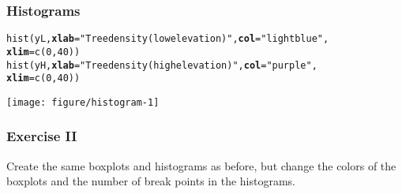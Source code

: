 \documentclass[color=usenames,dvipsnames]{beamer}\usepackage[]{graphicx}\usepackage[]{color}
\makeatletter
\newcommand{\hlnum}[1]{\textcolor[rgb]{0.69,0.494,0}{#1}}%
\newcommand{\hlstr}[1]{\textcolor[rgb]{0.749,0.012,0.012}{#1}}%
\newcommand{\hlstd}[1]{\textcolor[rgb]{0,0,0}{#1}}%
\newcommand{\hlkwc}[1]{\textcolor[rgb]{0,0,0}{\textbf{#1}}}%
\newcommand{\hlkwd}[1]{\textcolor[rgb]{0.004,0.004,0.506}{#1}}%
\newenvironment{kframe}{%
 \def\at@end@of@kframe{}%
 \ifinner\ifhmode%
  \def\at@end@of@kframe{\end{minipage}}%
  \begin{minipage}{\columnwidth}%
 \fi\fi%
 \def\FrameCommand##1{\hskip\@totalleftmargin \hskip-\fboxsep
 \colorbox{shadecolor}{##1}\hskip-\fboxsep
     \hskip-\linewidth \hskip-\@totalleftmargin \hskip\columnwidth}%
 \MakeFramed {\advance\hsize-\width
   \@totalleftmargin\z@ \linewidth\hsize
   \@setminipage}}%
 {\par\unskip\endMakeFramed%
 \at@end@of@kframe}
\newenvironment{knitrout}{}{} %
\makeatother
\begin{document}
\begin{frame}[fragile]
  \frametitle{Histograms}
  \footnotesize

\begin{knitrout}
\color{fgcolor}\begin{kframe}
\begin{alltt}
\hlkwd{hist}\hlstd{(yL,} \hlkwc{xlab}\hlstd{=}\hlstr{"Tree density (low elevation)"}\hlstd{,} \hlkwc{col}\hlstd{=}\hlstr{"lightblue"}\hlstd{,}
     \hlkwc{xlim}\hlstd{=}\hlkwd{c}\hlstd{(}\hlnum{0}\hlstd{,} \hlnum{40}\hlstd{))}
\hlkwd{hist}\hlstd{(yH,} \hlkwc{xlab}\hlstd{=}\hlstr{"Tree density (high elevation)"}\hlstd{,} \hlkwc{col}\hlstd{=}\hlstr{"purple"}\hlstd{,}
     \hlkwc{xlim}\hlstd{=}\hlkwd{c}\hlstd{(}\hlnum{0}\hlstd{,} \hlnum{40}\hlstd{))}
\end{alltt}
\end{kframe}
\end{knitrout}
\texttt{[image: figure/histogram-1]}
\end{frame}









\begin{frame}[fragile]
  \frametitle{Exercise II}
  \centering
  \Large
      Create the same boxplots and histograms as before, but
      change the colors of the boxplots and the number of break points in
      the histograms. \par
\end{frame}
\end{document}
